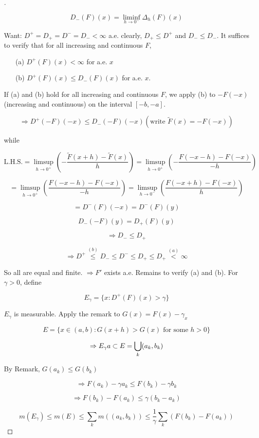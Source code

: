 \documentclass{article}
\theoremstyle{definition}
\newenvironment{proofs}[1][\proofname]{%
  \begin{proof}[#1]$ $\par\nobreak\ignorespaces
}{%
  \end{proof}
}
\begin{document}
\begin{proofs}
	$$D_-(F)(x) = \liminf_{h \to 0^-} \Delta_h (F)(x)$$

	Want: $D^+ = D_+ = D^- = D_- < \infty$ a.e. clearly, $D_+ \leq D^+$ and $D_- \leq D_-$. It suffices to verify that for all increasing and continuous $F$, 

	\begin{itemize}
	  \item[(a)] $D^+(F)(x) < \infty$ for a.e. $x$
	  \item[(b)] $D^+(F)(x) \leq D_-(F)(x)$ for a.e. $x$. 
	\end{itemize}

	If (a) and (b) hold for all increasing and continuous $F$, we apply (b) to $-F(-x)$ (increasing and continuous) on the interval $[-b, -a]$.

	$$\Rightarrow D^+(-F)(-x) \leq D_-(-F)(-x) (\text{write } \tilde{F}(x) = -F(-x))$$

	while

	$$\text{L.H.S.} = \limsup_{h \to 0^+} (-\frac{\tilde{F}(x+h) - \tilde{F}(x)}{h}) = \limsup_{h \to 0^+}  (-\frac{F(-x-h) - F(-x)}{-h})$$

	$$ = \limsup_{h \to 0^+} (\frac{F(-x-h) - F(-x)}{-h}) = \limsup_{h \to 0^-} (\frac{F(-x+h)- F(-x)}{h})$$


	$$ = D^-(F)(-x) = D^-(F)(y)$$

	$$D_-(-F)(y) = D_+(F)(y)$$

	$$\Rightarrow D_- \leq D_+$$

	$$\Rightarrow D^+ \stackrel{(b)}{\leq} D_- \leq D^- \leq D_+ \leq D_+ \stackrel{(a)}{<} \infty$$

	So all are equal and finite. $\Rightarrow F'$ exists a.e. Remains to verify (a) and (b). For $\gamma > 0$, define 

	$$E_\gamma = \{x: D^+ (F)(x) > \gamma\}$$

	$E_\gamma$ is measurable. Apply the remark to $G(x) = F(x) - \gamma_x$

	$$E = \{x \in (a, b): G(x + h) > G(x) \text{ for some } h > 0\}$$

	$$\Rightarrow E_\gamma \\ {a} \subset E = \bigcup_k (a_k, b_k)$$

	By Remark, $G(a_k) \leq G(b_k)$

	$$\Rightarrow F(a_k) - \gamma a_k \leq F(b_k) - \gamma b_k$$

	$$\Rightarrow F(b_k) - F(a_k) \leq \gamma (b_k - a_k)$$

	$$m(E_\gamma) \leq m(E) \leq \sum_k m((a_k, b_k)) \leq \frac{1}{\gamma} \sum_k (F(b_k) - F(a_k))$$


\end{proofs}
\end{document}
